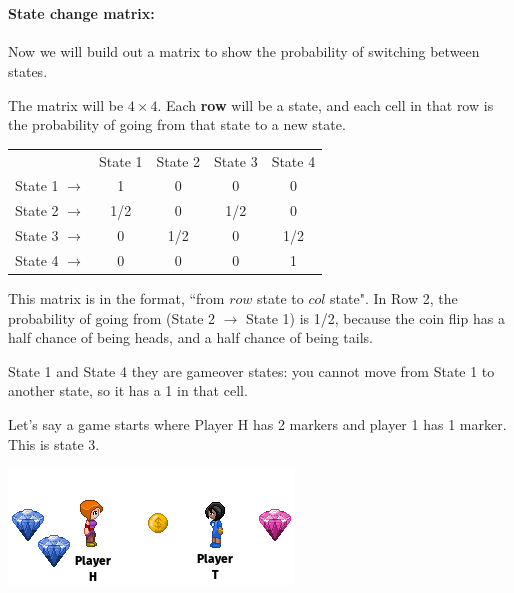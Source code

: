 {\begin{intro}{\ }
            \paragraph{State change matrix:} Now we will build out
            a matrix to show the probability of switching between states.

            The matrix will be $4 \times 4$. Each \textbf{row} will be
            a state, and each cell in that row is the probability of going
            from that state to a new state.

            \begin{center}
                \begin{tabular}{l c c c c}
                    & State 1 & State 2 & State 3 & State 4
                    \\
                    State 1 $\to$ &
                        1 & 0 & 0 & 0
                    \\
                    State 2 $\to$ &
                        1/2 & 0 & 1/2 & 0
                    \\
                    State 3 $\to$ &
                        0 & 1/2 & 0 & 1/2
                    \\
                    State 4 $\to$ &
                        0 & 0 & 0 & 1
                \end{tabular}
            \end{center}

            This matrix is in the format, ``from $row$ state to $col$ state".
            In Row 2, the probability of going from (State 2 $\to$ State 1) is 1/2,
            because the coin flip has a half chance of being heads, and a half chance
            of being tails.

            State 1 and State 4 they are gameover states: you cannot
            move from State 1 to another state, so it has a 1 in that cell.
            
        \end{intro}

    \newpage

    \begin{questionNOGRADE}{\thequestion}
        Let's say a game starts where Player H has 2 markers and
        player 1 has 1 marker. This is state 3.

        \begin{center}
            \includegraphics{images/6-6-game.png}
        \end{center}


\end{questionNOGRADE}}
